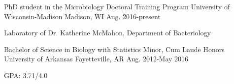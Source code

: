 
\begin{cventries}
  \cventry
    {PhD student in the Microbiology Doctoral Training Program} %
    {University of Wisconsin-Madison} %
    {Madison, WI} %
    {Aug. 2016-present} %
    {
      \begin{cvitems} %
        \item {Laboratory of Dr. Katherine McMahon, Department of Bacteriology}
      \end{cvitems}
    }
  \cventry
    {Bachelor of Science in Biology with Statistics Minor, Cum Laude Honors} %
    {University of Arkansas} %
    {Fayetteville, AR} %
    {Aug. 2012-May 2016} %
    {
     \begin{cvitems} %
        \item{GPA: 3.71/4.0}
      \end{cvitems}
    }
\end{cventries}
